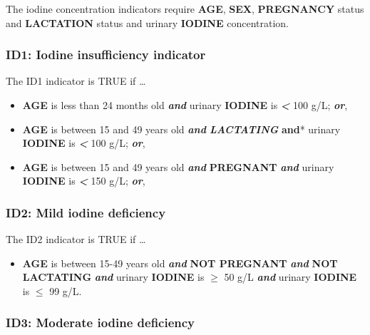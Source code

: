 \documentclass[12pt,a4paper]{article}
\providecommand{\tightlist}{%
  \setlength{\itemsep}{0pt}\setlength{\parskip}{0pt}}
\begin{document}
The iodine concentration indicators require \textbf{AGE}, \textbf{SEX}, \textbf{PREGNANCY} status and \textbf{LACTATION} status and urinary \textbf{IODINE} concentration.

\hypertarget{id1-iodine-insufficiency-indicator}{%
\subsubsection{ID1: Iodine insufficiency indicator}\label{id1-iodine-insufficiency-indicator}}

The ID1 indicator is TRUE if \ldots{}

\begin{itemize}
\item
  \textbf{AGE} is less than 24 months old \textbf{\emph{and}} urinary \textbf{IODINE} is \textbf{\emph{\textless{}}} 100 g/L; \textbf{\emph{or}},
\item
  \textbf{AGE} is between 15 and 49 years old \emph{\textbf{and} \textbf{LACTATING} }\textbf{and}* urinary \textbf{IODINE} is \textbf{\emph{\textless{}}} 100 g/L; \textbf{\emph{or}},
\item
  \textbf{AGE} is between 15 and 49 years old \textbf{\emph{and}} \textbf{PREGNANT} \textbf{\emph{and}} urinary \textbf{IODINE} is \textbf{\emph{\textless{}}} 150 g/L; \textbf{\emph{or}},
\end{itemize}

\hypertarget{id2-mild-iodine-deficiency}{%
\subsubsection{ID2: Mild iodine deficiency}\label{id2-mild-iodine-deficiency}}

The ID2 indicator is TRUE if \ldots{}

\begin{itemize}
\tightlist
\item
  \textbf{AGE} is between 15-49 years old \textbf{\emph{and}} \textbf{NOT PREGNANT} \textbf{\emph{and}} \textbf{NOT LACTATING} \textbf{\emph{and}} urinary \textbf{IODINE} is \textbf{\emph{\(\geq\)}} 50 g/L \textbf{\emph{and}} urinary \textbf{IODINE} is \textbf{\emph{\(\leq\)}} 99 g/L.
\end{itemize}

\hypertarget{id3-moderate-iodine-deficiency}{%
\subsubsection{ID3: Moderate iodine deficiency}\label{id3-moderate-iodine-deficiency}}
\end{document}

